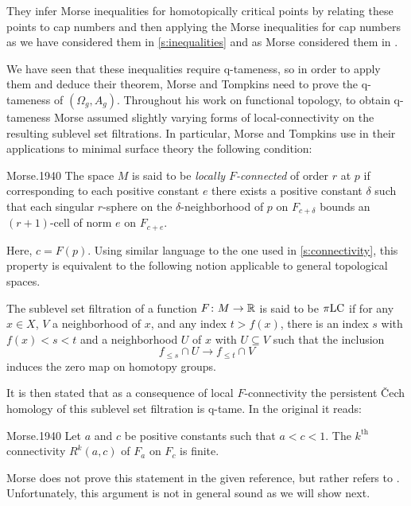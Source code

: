 They infer Morse inequalities for homotopically critical points by relating these points to cap numbers and then applying the Morse inequalities for cap numbers as we have considered them in \cref{s:inequalities} and as Morse considered them in \cite{Morse.1940}.

We have seen that these inequalities require q-tameness, so in order to apply them and deduce their theorem, Morse and Tompkins need to prove the \mbox{q-tameness} of $(\Omega_g, A_g)$.
Throughout his work on functional topology, to obtain q-tameness Morse assumed slightly varying forms of local-connectivity on the resulting sublevel set filtrations.
In particular, Morse and Tompkins use in their applications to minimal surface theory the following condition:
\begin{displaycquote}[p.431]{Morse.1940}
	The space $M$ is said to be \textit{locally $F$-connected} of order $r$ at $p$ if corresponding to each positive constant $e$ there exists a positive constant $\delta$ such that each singular $r$-sphere on the $\delta$-neighborhood of $p$ on $F_{c+\delta}$ bounds an $(r+1)$-cell of norm $e$ on $F_{c+e}$.
\end{displaycquote}
Here, $c = F(p)$.
Using similar language to the one used in \cref{s:connectivity}, this property is equivalent to the following notion applicable to general topological spaces.

\begin{defi}
    The sublevel set filtration of a function $F \colon M \to \mathbb{R}$ is said to be $\pi\mathrm{LC}$	if for any $x \in X$, $V$ a neighborhood of $x$, and any index $t > f(x)$, there is an index $s$ with  $f(x) < s < t$ and a neighborhood $U$ of $x$ with $U \subseteq V$ such that the inclusion
	\begin{equation*}
	f_{\leq s} \cap U \to f_{\leq t} \cap V
	\end{equation*}
	induces the zero map on homotopy groups.
\end{defi}

It is then stated that as a consequence of local $F$-connectivity the persistent \v{C}ech homology of this sublevel set filtration is q-tame.
In the original it reads:

\begin{displaycquote}[Theorem 6.3, p.432]{Morse.1940}
	Let $a$ and $c$ be positive constants such that $a < c < 1$.
	The $k^{\mathrm{th}}$ connectivity $R^k(a,c)$ of $F_a$ on $F_c$ is finite.
\end{displaycquote}
Morse does not prove this statement in the given reference, but rather refers to \cite[Theorem~6.1]{Morse.1938}.
Unfortunately, this argument is not in general sound as we will show next.

